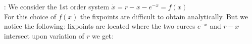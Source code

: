 \underline{}: We consider the 1st order system $\dot{x}=r-x-e^{-x}=f(x)$\\
For this choice of $f(x)$ the fixpoints are difficult to obtain analytically. But we notice the following: fixpoints are located where the two curces $e^{-x}$ and $r-x$ intersect upon variation of $r$ we get:
\begin{figure}[H]
\end{figure}
